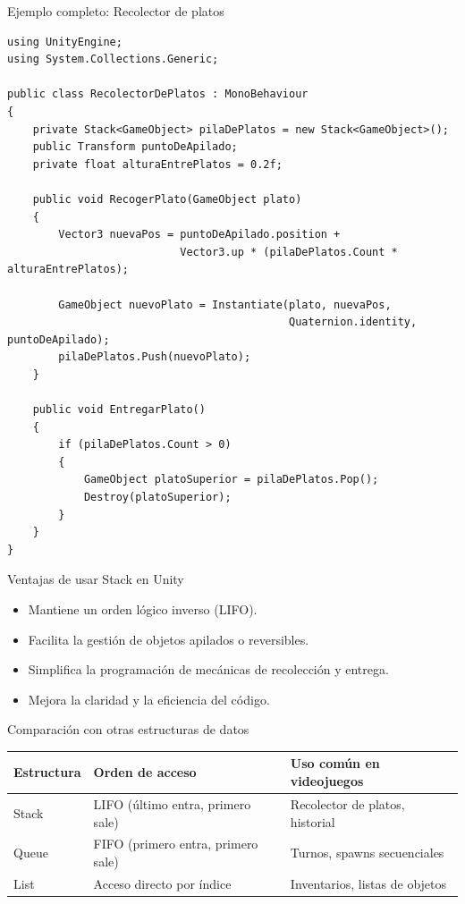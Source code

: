 \documentclass{beamer}
\begin{document}
\begin{frame}[fragile]{Ejemplo completo: Recolector de platos}
\begin{lstlisting}
using UnityEngine;
using System.Collections.Generic;

public class RecolectorDePlatos : MonoBehaviour
{
    private Stack<GameObject> pilaDePlatos = new Stack<GameObject>();
    public Transform puntoDeApilado;
    private float alturaEntrePlatos = 0.2f;

    public void RecogerPlato(GameObject plato)
    {
        Vector3 nuevaPos = puntoDeApilado.position + 
                           Vector3.up * (pilaDePlatos.Count * alturaEntrePlatos);

        GameObject nuevoPlato = Instantiate(plato, nuevaPos, 
                                            Quaternion.identity, puntoDeApilado);
        pilaDePlatos.Push(nuevoPlato);
    }

    public void EntregarPlato()
    {
        if (pilaDePlatos.Count > 0)
        {
            GameObject platoSuperior = pilaDePlatos.Pop();
            Destroy(platoSuperior);
        }
    }
}
\end{lstlisting}
\end{frame}

\begin{frame}{Ventajas de usar Stack en Unity}
\begin{itemize}
    \item Mantiene un orden lógico inverso (LIFO).
    \item Facilita la gestión de objetos apilados o reversibles.
    \item Simplifica la programación de mecánicas de recolección y entrega.
    \item Mejora la claridad y la eficiencia del código.
\end{itemize}
\end{frame}

\begin{frame}{Comparación con otras estructuras de datos}
\begin{table}[]
\centering
\begin{tabular}{|l|l|l|}
\hline
\textbf{Estructura} & \textbf{Orden de acceso} & \textbf{Uso común en videojuegos} \\ \hline
Stack & LIFO (último entra, primero sale) & Recolector de platos, historial \\ \hline
Queue & FIFO (primero entra, primero sale) & Turnos, spawns secuenciales \\ \hline
List & Acceso directo por índice & Inventarios, listas de objetos \\ \hline
\end{tabular}
\end{table}
\end{frame}
\end{document}
